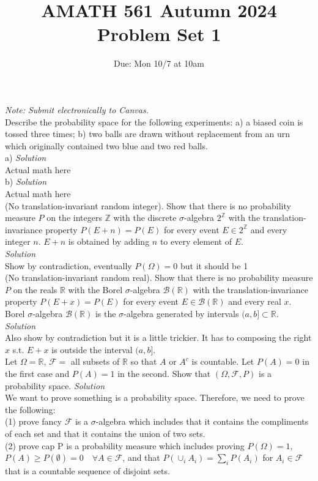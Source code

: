 \documentclass[11pt]{article}
\title{AMATH 561 Autumn 2024 \\ Problem Set 1}
\date{Due: Mon 10/7 at 10am}
\begin{document}
\maketitle

{\it Note: Submit electronically to Canvas. }
\\

 Describe the probability space for the following experiments: a) a biased coin is tossed three times; b)  two balls are drawn without replacement from an urn which originally contained two blue and two red balls. \\
a) \textit{ Solution} \\
Actual math here \\
b) \textit{ Solution} \\
Actual math here \\

 (No translation-invariant random integer). Show that there is no probability measure $P$ on the integers $\mathds{Z}$ with the discrete
$\sigma$-algebra $2^{\mathds{Z}}$ with the translation-invariance property $P(E + n) = P(E)$ for every event $E \in 2^{\mathds{Z}}$ and every integer $n$. $E+n$ is obtained by adding $n$ to every element of $E$.
\\
\textit{ Solution} \\
Show by contradiction, eventually $P(\Omega) = 0$ but it should be 1 \\

  (No translation-invariant random real). Show that there is no probability measure $P$ on the reals $\mathds{R}$ with the Borel
$\sigma$-algebra $\mathcal{B}(\mathds{R})$ with the translation-invariance property $P(E + x) = P(E)$ for every event $E \in \mathcal{B}(\mathds{R})$ and every real $x$. Borel $\sigma$-algebra $\mathcal{B}(\mathds{R})$ is the $\sigma$-algebra generated by intervals $(a,b] \subset \mathds{R}$.
\\
\textit{ Solution} \\
Also show by contradiction but it is a little trickier. It has to composing the right $x$ s.t. $E + x$ is outside the interval $(a, b]$.\\

 Let $\Omega=\mathds{R}$, $\mathcal{F}=$ all subsets of $\mathds{R}$ so that $A$ or $A^c$ is countable. Let $P(A)=0$ in the first case and $P(A)=1$ in the second. Show that $(\Omega, \mathcal{F}, P)$ is a probability space.
\textit{ Solution} \\
We want to prove something is a probability space. Therefore, we need to prove the following: \\
(1) prove fancy $\mathcal{F}$ is a $\sigma$-algebra which includes that it contains the compliments of each set and that it contains the union of two sets. \\
(2) prove cap P is a probability measure which includes proving 
$P(\Omega) = 1$, $P(A) \geq P(\emptyset) = 0 \quad \forall A \in \mathcal{F}$, 
and that $P(\cup_i A_i) = \sum_i P(A_i)$ for $A_i \in \mathcal{F}$ 
that is a countable sequence of disjoint sets.
\end{document}
